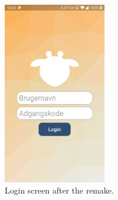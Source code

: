 \begin{figure}[H]
  \centering
    \includegraphics[width=0.4\textwidth]{sections/1Sprint/images/loginScreen_new.jpg}
    \caption{Login screen after the remake.}
    \label{fig:loginscreenNew}
\end{figure}
